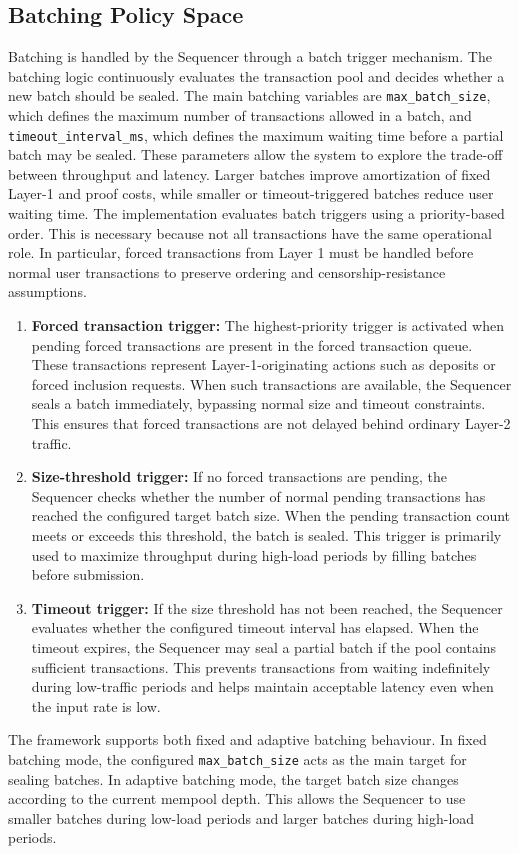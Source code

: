 \subsection{Batching Policy Space} \label{subsec:batching_policy_space} Batching is handled by the Sequencer through a batch trigger mechanism. The batching logic continuously evaluates the transaction pool and decides whether a new batch should be sealed. The main batching variables are \texttt{max\_batch\_size}, which defines the maximum number of transactions allowed in a batch, and \texttt{timeout\_interval\_ms}, which defines the maximum waiting time before a partial batch may be sealed. These parameters allow the system to explore the trade-off between throughput and latency. Larger batches improve amortization of fixed Layer-1 and proof costs, while smaller or timeout-triggered batches reduce user waiting time. The implementation evaluates batch triggers using a priority-based order. This is necessary because not all transactions have the same operational role. In particular, forced transactions from Layer 1 must be handled before normal user transactions to preserve ordering and censorship-resistance assumptions. \begin{enumerate} \item \textbf{Forced transaction trigger:} The highest-priority trigger is activated when pending forced transactions are present in the forced transaction queue. These transactions represent Layer-1-originating actions such as deposits or forced inclusion requests. When such transactions are available, the Sequencer seals a batch immediately, bypassing normal size and timeout constraints. This ensures that forced transactions are not delayed behind ordinary Layer-2 traffic. \item \textbf{Size-threshold trigger:} If no forced transactions are pending, the Sequencer checks whether the number of normal pending transactions has reached the configured target batch size. When the pending transaction count meets or exceeds this threshold, the batch is sealed. This trigger is primarily used to maximize throughput during high-load periods by filling batches before submission. \item \textbf{Timeout trigger:} If the size threshold has not been reached, the Sequencer evaluates whether the configured timeout interval has elapsed. When the timeout expires, the Sequencer may seal a partial batch if the pool contains sufficient transactions. This prevents transactions from waiting indefinitely during low-traffic periods and helps maintain acceptable latency even when the input rate is low. \end{enumerate} The framework supports both fixed and adaptive batching behaviour. In fixed batching mode, the configured \texttt{max\_batch\_size} acts as the main target for sealing batches. In adaptive batching mode, the target batch size changes according to the current mempool depth. This allows the Sequencer to use smaller batches during low-load periods and larger batches during high-load periods. 


